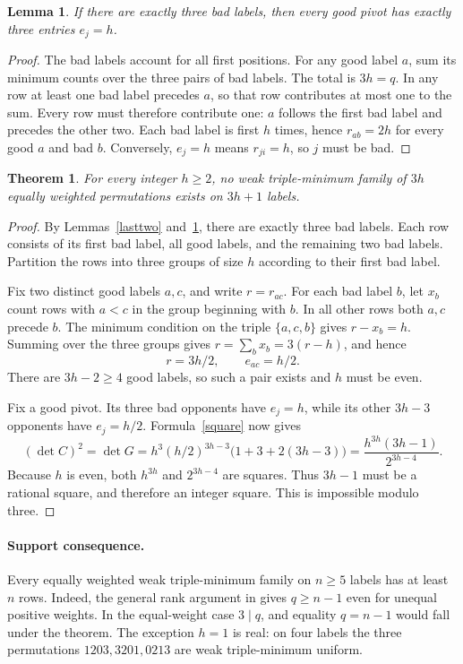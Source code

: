 \documentclass[11pt]{article}
\newtheorem{lemma}{Lemma}
\newtheorem{theorem}{Theorem}
\begin{document}
\begin{lemma}\label{threebad}
If there are exactly three bad labels, then every good pivot has
exactly three entries $e_j=h$.
\end{lemma}
\begin{proof}
The bad labels account for all first positions. For any good label $a$,
sum its minimum counts over the three pairs of bad labels. The total
is $3h=q$. In any row at least one bad label precedes $a$, so that row
contributes at most one to the sum. Every row must therefore
contribute one: $a$ follows the first bad label and precedes the other
two. Each bad label is first $h$ times, hence $r_{ab}=2h$ for every
good $a$ and bad $b$. Conversely, $e_j=h$ means $r_{ji}=h$, so $j$
must be bad.
\end{proof}

\begin{theorem}
For every integer $h\ge2$, no weak triple-minimum family of $3h$
equally weighted permutations exists on $3h+1$ labels.
\end{theorem}
\begin{proof}
By Lemmas~\ref{lasttwo} and~\ref{threebad}, there are exactly three
bad labels. Each row consists of its first bad label, all good
labels, and the remaining two bad labels. Partition the rows into
three groups of size $h$ according to their first bad label.

Fix two distinct good labels $a,c$, and write $r=r_{ac}$. For each
bad label $b$, let $x_b$ count rows with $a<c$ in the group beginning
with $b$. In all other rows both $a,c$ precede $b$. The minimum
condition on the triple $\{a,c,b\}$ gives $r-x_b=h$. Summing over
the three groups gives $r=\sum_bx_b=3(r-h)$, and hence
\[
 r=3h/2,\qquad e_{ac}=h/2.
\]
There are $3h-2\ge4$ good labels, so such a pair exists and $h$
must be even.

Fix a good pivot. Its three bad opponents have $e_j=h$, while its
other $3h-3$ opponents have $e_j=h/2$. Formula~\eqref{square} now
gives
\[
 (\det C)^2=\det G
 =h^3(h/2)^{3h-3}\bigl(1+3+2(3h-3)\bigr)
 =\frac{h^{3h}(3h-1)}{2^{3h-4}}.
\]
Because $h$ is even, both $h^{3h}$ and $2^{3h-4}$ are squares.
Thus $3h-1$ must be a rational square, and therefore an integer
square. This is impossible modulo three.
\end{proof}

\paragraph{Support consequence.}
Every equally weighted weak triple-minimum family on $n\ge5$ labels
has at least $n$ rows. Indeed, the general rank argument in
 gives
$q\ge n-1$ even for unequal positive weights. In the equal-weight
case $3\mid q$, and equality $q=n-1$ would fall under the theorem.
The exception $h=1$ is real: on four labels the three permutations
$1203,3201,0213$ are weak triple-minimum uniform.
\end{document}
